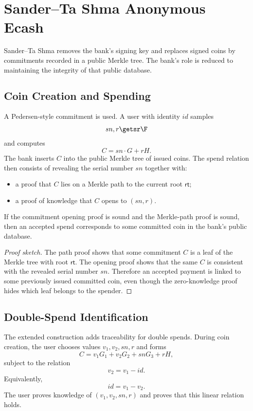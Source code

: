 \documentclass[11pt]{article}
\begin{document}
\section{Sander--Ta Shma Anonymous Ecash}

Sander--Ta Shma removes the bank's signing key and replaces signed coins by
commitments recorded in a public Merkle tree.  The bank's role is reduced to
maintaining the integrity of that public database.

\subsection{Coin Creation and Spending}

A Pedersen-style commitment is used.  A user with identity
$id$ samples
\[
  sn, r \getsr \F
\]
and computes
\[
  C = sn \cdot G + rH.
\]
The bank inserts $C$ into the public Merkle tree of issued coins.  The spend
relation then consists of revealing the serial number $sn$ together with:
\begin{itemize}
  \item a proof that $C$ lies on a Merkle path to the current root $\mathsf{rt}$;
  \item a proof of knowledge that $C$ opens to $(sn,r)$.
\end{itemize}

\begin{proposition}
If the commitment opening proof is sound and the Merkle-path proof is sound,
then an accepted spend corresponds to some committed coin in the bank's public
database.
\end{proposition}

\begin{proof}[Proof sketch]
The path proof shows that some commitment $C$ is a leaf of the Merkle tree with
root $\mathsf{rt}$.  The opening proof shows that the same $C$ is consistent
with the revealed serial number $sn$.  Therefore an accepted payment is linked
to some previously issued committed coin, even though the zero-knowledge proof
hides which leaf belongs to the spender.
\end{proof}

\subsection{Double-Spend Identification}

The extended construction adds traceability for double spends.  During coin
creation, the user chooses values $v_1,v_2,sn,r$ and forms
\[
  C = v_1 G_1 + v_2 G_2 + sn G_3 + rH,
\]
subject to the relation
\[
  v_2 = v_1 - id.
\]
Equivalently,
\[
  id = v_1 - v_2.
\]
The user proves knowledge of $(v_1,v_2,sn,r)$ and proves that this linear
relation holds.
\end{document}
